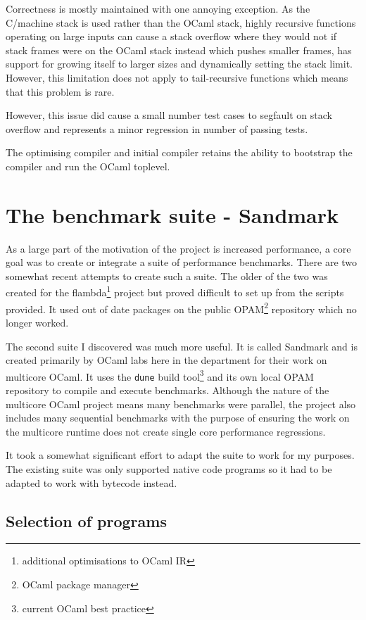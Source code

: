 Correctness is mostly maintained with one annoying exception. As the C/machine stack is used rather
than
the OCaml stack, highly recursive functions operating on large inputs can cause a stack overflow
where they would not if stack frames were on the OCaml stack instead which pushes smaller frames,
has support for growing itself to larger sizes and dynamically setting the stack limit. However,
this limitation does not apply to tail-recursive functions which means that this problem is rare.

However, this issue did cause a small number test cases to segfault on stack overflow and
represents
a minor regression in number of passing tests.

The optimising compiler and initial compiler retains the ability to bootstrap the compiler and run
the OCaml toplevel.

\section{The benchmark suite - Sandmark}

As a large part of the motivation of the project is increased performance, a core goal was to
create or
integrate a suite of performance benchmarks. There are two somewhat recent attempts to create such
a
suite. The older of the two was created for the flambda\footnote{additional optimisations to OCaml
      IR} project but proved difficult to set up from the scripts provided. It used out of date
packages
on the public OPAM\footnote{OCaml package manager} repository which no longer worked.

The second suite I discovered was much more useful. It is called Sandmark and is created primarily
by OCaml labs here in the department for their work on multicore OCaml. It uses the \texttt{dune}
build tool\footnote{current OCaml best practice} and its own local OPAM repository to compile and
execute benchmarks. Although the nature of the multicore OCaml project means many benchmarks were
parallel, the project also includes many sequential benchmarks with the purpose of ensuring the
work
on the multicore runtime does not create single core performance regressions.

It took a somewhat significant effort to adapt the suite to work for my purposes. The existing
suite was
only supported native code programs so it had to be adapted to work with bytecode instead.

\subsection{Selection of programs}

